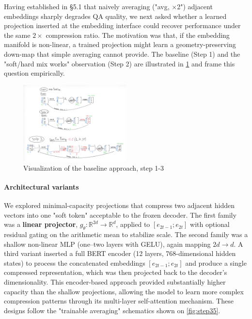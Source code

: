 Having established in \S5.1 that naively averaging ("avg, ×2") adjacent embeddings sharply degrades QA quality, we next asked whether a learned projection inserted at the embedding interface could recover performance under the same $2\times$ compression ratio.
The motivation was that, if the embedding manifold is non-linear, a trained projection might learn a geometry-preserving down-map that simple averaging cannot provide.
The baseline (Step 1) and the "soft/hard mix works" observation (Step 2) are illustrated in \ref{fig:steps1-3} and frame this question empirically.

\begin{figure}[hbt]
  \centering
  \includegraphics[width=0.5\textwidth]{graphs/steps1-3.jpg}
  \caption{Visualization of the baseline approach, step 1-3}
  \label{fig:steps1-3}
\end{figure}  

\paragraph{Architectural variants}
We explored minimal-capacity projections that compress two adjacent hidden vectors into one "soft token" acceptable to the frozen decoder.
The first family was a \textbf{linear projector}, $g_\theta:\mathbb{R}^{2d}\to\mathbb{R}^{d}$, applied to $[e_{2t-1};e_{2t}]$ with optional residual gating on the arithmetic mean to stabilize scale.
The second family was a shallow non-linear MLP (one--two layers with GELU), again mapping $2d\to d$.
A third variant inserted a full BERT encoder \cite{devlin2018bert} (12 layers, 768-dimensional hidden states) to process the concatenated embeddings $[e_{2t-1};e_{2t}]$ and produce a single compressed representation, which was then projected back to the decoder's dimensionality.
This encoder-based approach provided substantially higher capacity than the shallow projections, allowing the model to learn more complex compression patterns through its multi-layer self-attention mechanism.
These designs follow the "trainable averaging" schematics shown on \ref{fig:step35}.


